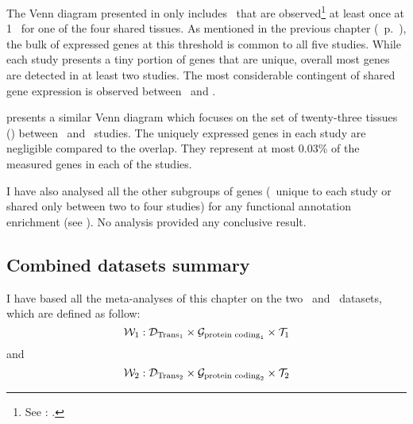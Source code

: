 The Venn diagram presented in  only includes \pcgs\
that are observed\footnote{See
: .}
at least once at 1 \FPKM\ for one of the four shared tissues.
As mentioned in the previous chapter (~p.~\pageref{def:trep}),
the bulk of expressed genes at this threshold is common
to all five studies.
While each study presents a tiny portion of genes
that are unique,
overall most genes are detected in at least two studies.
The most considerable contingent of shared gene expression is observed
between \uhlen\ and \gtex.\mybr\

 presents a similar Venn diagram
which focuses on the set of twenty-three tissues (\setTwo)
between \uhlen\ and \gtex\ studies.
The uniquely expressed genes in each study are negligible compared to the overlap.
They represent at most 0.03\% of the measured genes in each of the studies.\mybr\

I have also analysed all the other subgroups of genes
(\ie\ unique to each study or shared only between two to four studies)
for any functional annotation enrichment (see ).
No analysis provided any conclusive result.\mybr\

\subsection{Combined datasets summary}


I have based all the meta-analyses of this chapter
on the two \setOne\ and \setTwo\ datasets,
which are defined as follow:
\begin{equation*}
        \mathcal{W}_1: \mathcal{D}_{\text{Trans}_1} \times
                     \mathcal{G}_{\text{protein coding}_1} \times
                     \mathcal{T}_1
\end{equation*}
and
\begin{equation*}
        \mathcal{W}_2: \mathcal{D}_{\text{Trans}_2} \times
                     \mathcal{G}_{\text{protein coding}_2} \times
                     \mathcal{T}_2
\end{equation*}


